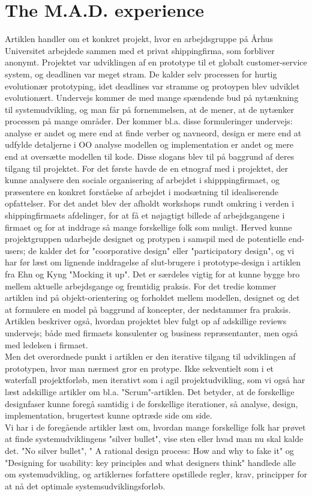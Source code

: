 \documentclass[12pt]{article}   %
\begin{document}
\section{The M.A.D. experience}
Artiklen handler om et konkret projekt, hvor en arbejdsgruppe på Århus Universitet arbejdede sammen med et privat shippingfirma, som forbliver anonymt. Projektet var udviklingen af en prototype til et globalt customer-service system, og deadlinen var meget stram. De kalder selv processen for hurtig evolutionær prototyping, idet deadlines var stramme og protoypen blev udviklet evolutionært. Undervejs kommer de med mange spændende bud på nytænkning til systemudvikling, og man får på fornemmelsen, at de mener, at de nytænker processen på mange områder. Der kommer bl.a. disse formuleringer undervejs: analyse er andet og mere end at finde verber og navneord, design er mere end at udfylde detaljerne i OO analyse modellen og implementation er andet og mere end at oversætte modellen til kode. Disse slogans blev til på baggrund af deres tilgang til projektet. For det første havde de en etnograf med i projektet, der kunne analysere den sociale organisering af arbejdet i shipppingfirmaet, og præsentere en konkret forståelse af arbejdet i modsætning til idealiserende opfattelser. For det andet blev der afholdt workshops rundt omkring i verden i shippingfirmaets afdelinger, for at få et nøjagtigt billede af arbejdsgangene i firmaet og for at inddrage så mange forskellige folk som muligt. Herved kunne projektgruppen udarbejde designet og protypen i samspil med de potentielle end-users; de kalder det for "coorporative design" eller "participatory design", og vi har før læst  om lignende inddragelse af slut-brugere i prototype-design i artiklen fra Ehn og Kyng "Mocking it up". Det er særdeles vigtig for at kunne bygge bro mellem aktuelle arbejdsgange og fremtidig praksis. For det tredie kommer artiklen ind på objekt-orientering og forholdet mellem modellen, designet og det at formulere en model på baggrund af koncepter, der nedstammer fra praksis.   \\
Artiklen beskriver også, hvordan projektet blev fulgt op af adskillige reviews undervejs; både med firmaets konsulenter og business repræsentanter, men også med ledelsen i firmaet. \\
Men det overordnede punkt i artiklen er den iterative tilgang til udviklingen af prototypen, hvor man nærmest gror en protype. Ikke sekventielt som i et waterfall projektforløb, men iterativt som i agil projektudvikling, som vi også har læst adskillige artikler om bl.a. "Scrum"-artiklen. Det betyder, at de forskellige designfaser kunne foregå samtidig i de forskellige iterationer, så analyse, design, implementation, brugertest kunne optræde side om side. \\
Vi har i de foregående artikler læst om, hvordan mange forskellige folk har prøvet at finde systemudviklingens "silver bullet", vise sten eller hvad man nu skal kalde det. "No silver bullet", " A rational design process: How and why to fake it" og "Designing for usability: key principles and what designers think" handlede alle om  systemudvikling, og artiklernes forfattere opstillede regler, krav, principper for at nå det optimale systemsudviklingsforløb. \\
\end{document}
